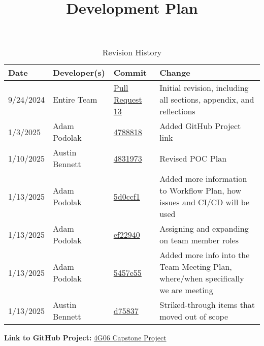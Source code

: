 \documentclass{article}
\title{Development Plan\\\progname}
\author{\authname}
\date{}
\begin{document}
\maketitle

\begin{table}[htp]
\centering
\caption{Revision History}
\label{TblRevisionHistory}
\begin{tabularx}{\textwidth}{l l l X}
\toprule
\textbf{Date} & \textbf{Developer(s)} & \textbf{Commit} & \textbf{Change}\\

\midrule
9/24/2024 & 
Entire Team & 
\href{https://github.com/ausbennett/mes-finance-platform/pull/13}{Pull Request 13} & 
Initial revision, including all sections, appendix, and reflections\\
\midrule
 1/3/2025 & 
 Adam Podolak & 
 \href{https://github.com/ausbennett/mes-finance-platform/commit/47888184f492b1cae6cc4b35787fb0691bcb4e3c}{4788818} & 
 Added GitHub Project link\\
\midrule
1/10/2025 & Austin Bennett & \href{https://github.com/ausbennett/mes-finance-platform/commit/4831973b5533e5ae9d6ae4e884bd0cfebb49792d}{4831973} & Revised POC Plan\\
\midrule
1/13/2025 & Adam Podolak & \href{https://github.com/ausbennett/mes-finance-platform/commit/5d0ccf1931a5064d2b3c566b2cd5b87e3bde3956}{5d0ccf1} & Added more information to Workflow Plan, how issues and CI/CD will be used\\
\midrule
1/13/2025 & Adam Podolak & \href{https://github.com/ausbennett/mes-finance-platform/commit/ef22940cf6f0da91f66c243549b201f4809e8b71}{ef22940} & Assigning and expanding on team member roles\\
\midrule
1/13/2025 & Adam Podolak & \href{https://github.com/ausbennett/mes-finance-platform/commit/5457e55e43ee8edd5108ca66a843b3649b7b5821}{5457e55} & Added more info into the Team Meeting Plan, where/when specifically we are meeting\\

\midrule
1/13/2025 & Austin Bennett & \href{https://github.com/ausbennett/mes-finance-platform/commit/2fde98c01fda4d2d3b57062ea70d6dfbc8d75837}{d75837} & Striked-through items that moved out of scope\\

\bottomrule
\end{tabularx}
\end{table}

\textbf{Link to GitHub Project:} \href{https://github.com/users/ausbennett/projects/3}{4G06 Capstone Project}
\end{document}
